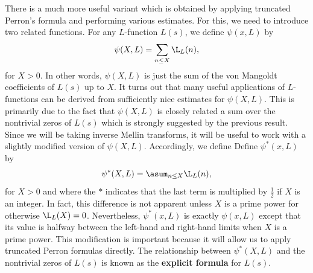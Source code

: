 \documentclass[12pt]{article}
\begin{document}
      There is a much more useful variant which is obtained by applying truncated Perron's formula and performing various estimates. For this, we need to introduce two related functions. For any \(L\)-function \(L(s)\), we define \(\psi(x,L)\) by
      \[
        \psi(X,L) = \sum_{n \le X}\L_{L}(n),
      \]
      for \(X > 0\). In other words, \(\psi(X,L)\) is just the sum of the von Mangoldt coefficients of \(L(s)\) up to \(X\). It turns out that many useful applications of \(L\)-functions can be derived from sufficiently nice estimates for \(\psi(X,L)\). This is primarily due to the fact that \(\psi(X,L)\) is closely related a sum over the nontrivial zeros of \(L(s)\) which is strongly suggested by the previous result. Since we will be taking inverse Mellin transforms, it will be useful to work with a slightly modified version of \(\psi(X,L)\). Accordingly, we define Define \(\psi^{\ast}(x,L)\) by
      \[
        \psi^{\ast}(X,L) = \asum_{n \le X}\L_{L}(n),
      \]
      for \(X > 0\) and where the \(\ast\) indicates that the last term is multiplied by \(\frac{1}{2}\) if \(X\) is an integer. In fact, this difference is not apparent unless \(X\) is a prime power for otherwise \(\L_{L}(X) = 0\). Nevertheless, \(\psi^{\ast}(x,L)\) is exactly \(\psi(x,L)\) except that its value is halfway between the left-hand and right-hand limits when \(X\) is a prime power. This modification is important because it will allow us to apply truncated Perron formulas directly. The relationship between \(\psi^{\ast}(X,L)\) and the nontrivial zeros of \(L(s)\) is known as the \textbf{explicit formula} for \(L(s)\).
\end{document}
